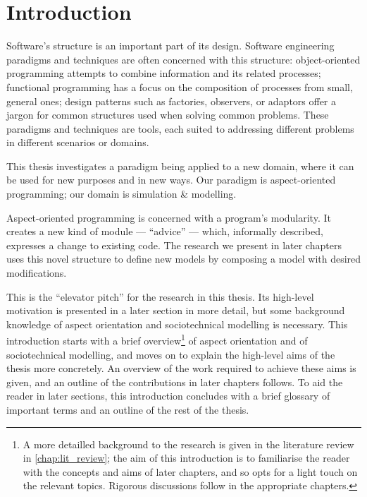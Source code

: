\chapter{Introduction}

Software's structure is an important part of its design. Software engineering
paradigms and techniques are often concerned with this structure:
object-oriented programming attempts to combine information and its related
processes; functional programming has a focus on the composition of processes
from small, general ones; design patterns such as factories, observers, or
adaptors offer a jargon for common structures used when solving common problems.
These paradigms and techniques are tools, each suited to addressing different
problems in different scenarios or domains.

This thesis investigates a paradigm
being applied to a new domain, where it can be used for new purposes and in new
ways. Our paradigm is aspect-oriented programming; our domain is \sociotechnical
simulation \& modelling. 

Aspect-oriented programming is concerned with a program's modularity. It creates
a new kind of module --- ``advice'' --- which, informally described, expresses
a change to existing code. The research we present in later chapters uses this
novel structure to define new models by composing a model with desired modifications.

This is the ``elevator pitch'' for the research in this thesis. Its high-level
motivation is
presented in a later section in more detail, but
some background knowledge of aspect orientation and sociotechnical modelling is necessary. 
This introduction starts with a brief overview\footnote{A more detailled
  background to the research is given
in the literature review in \cref{chap:lit_review}; the aim of this introduction is to familiarise
the reader with the concepts and aims of later chapters, and so opts for a light touch on the 
relevant topics. Rigorous discussions follow in the appropriate chapters.} of aspect orientation and of
sociotechnical modelling, and moves on to explain the high-level aims of the thesis more
concretely. An overview of the work required to achieve these aims is given, and an outline
of the contributions in later chapters follows. To aid the reader in later sections,
this introduction concludes with a brief glossary of important terms and an outline of
the rest of the thesis.




